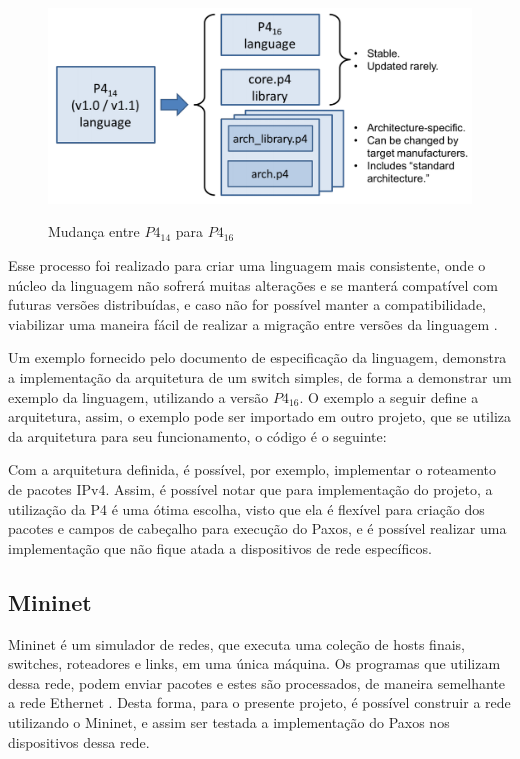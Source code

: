 \documentclass[12pt,
openright, 
oneside,
a4paper,
brazil]{facom-ufu-abntex2}
\theoremstyle{definition}
\begin{document}
\begin{figure}[h]
    \caption{Mudança entre $P4_{14}$ para $P4_{16}$}
    \centering
    \includegraphics[width=\textwidth]{images/p414To16.png}
    \label{fig:language-comparison}
\end{figure}

Esse processo foi realizado para criar uma linguagem mais consistente, onde o núcleo da 
linguagem não sofrerá muitas alterações e se manterá compatível com futuras versões 
distribuídas, e caso não for possível manter a compatibilidade, viabilizar uma maneira 
fácil de realizar a migração entre versões da linguagem \citep{paxos16spec}.

Um exemplo fornecido pelo documento de especificação da linguagem, demonstra a implementação
da arquitetura de um switch simples, de forma a demonstrar um exemplo  da linguagem,
utilizando a versão $P4_{16}$\citep{paxos16spec}. O exemplo a seguir define a arquitetura,
assim, o exemplo pode ser importado em outro projeto, que se utiliza da arquitetura para
seu funcionamento, o código é o seguinte:



Com a arquitetura definida, é possível, por exemplo, implementar o roteamento de pacotes
IPv4. Assim, é possível notar que para implementação do projeto, a utilização da P4
é uma ótima escolha, visto que ela é flexível para criação dos pacotes e campos de cabeçalho
para execução do Paxos, e é possível realizar uma implementação que não fique atada a 
dispositivos de rede específicos.

\subsection{Mininet}
Mininet é um simulador de redes, que executa uma coleção de hosts finais, switches, 
roteadores e links, em uma única máquina. Os programas que utilizam dessa rede, podem enviar
pacotes e estes são processados, de maneira semelhante a rede Ethernet \citep{mininetDocs}.
Desta forma, para o presente projeto, é possível construir a rede utilizando o Mininet, e 
assim ser testada a implementação do Paxos nos dispositivos dessa rede.
\end{document}

